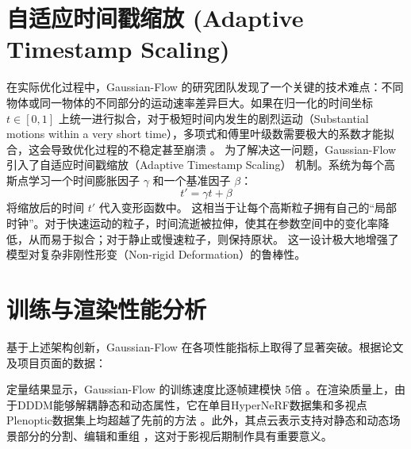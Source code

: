\section{自适应时间戳缩放 (Adaptive Timestamp Scaling)}

在实际优化过程中，Gaussian-Flow 的研究团队发现了一个关键的技术难点：不同物体或同一物体的不同部分的运动速率差异巨大。如果在归一化的时间坐标 $t \in [0, 1]$ 上统一进行拟合，对于极短时间内发生的剧烈运动（Substantial motions within a very short time），多项式和傅里叶级数需要极大的系数才能拟合，这会导致优化过程的不稳定甚至崩溃 \cite{lin2024gaussianflow_cvpr}。
为了解决这一问题，Gaussian-Flow 引入了自适应时间戳缩放（Adaptive Timestamp Scaling） 机制。系统为每个高斯点学习一个时间膨胀因子 $\gamma$ 和一个基准因子 $\beta$：
$$
t' = \gamma t + \beta
$$
将缩放后的时间 $t'$ 代入变形函数中。
这相当于让每个高斯粒子拥有自己的“局部时钟”。对于快速运动的粒子，时间流逝被拉伸，使其在参数空间中的变化率降低，从而易于拟合；对于静止或慢速粒子，则保持原状。
这一设计极大地增强了模型对复杂非刚性形变（Non-rigid Deformation）的鲁棒性。

\section{训练与渲染性能分析}

基于上述架构创新，Gaussian-Flow 在各项性能指标上取得了显著突破。根据论文及项目页面的数据：

\begin{table}[h]
\centering
{}
\caption{不同方法的性能对比}
\end{table}

定量结果显示，Gaussian-Flow 的训练速度比逐帧建模快 5倍 \cite{lin2024gaussianflow_cvpr}。在渲染质量上，由于DDDM能够解耦静态和动态属性，它在单目HyperNeRF数据集和多视点Plenoptic数据集上均超越了先前的方法 \cite{lin2024gaussianflow_cvpr}。此外，其点云表示支持对静态和动态场景部分的分割、编辑和重组 \cite{lin2024gaussianflow_cvpr}，这对于影视后期制作具有重要意义。

